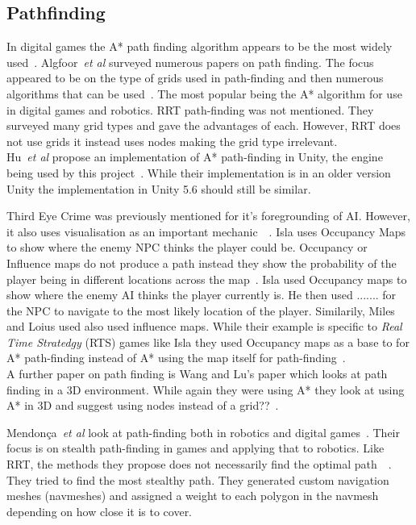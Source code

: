 \documentclass[journal]{IEEEtran}
\begin{document}
\subsection{Pathfinding}
In digital games the A* path finding algorithm appears to be the most widely used~\cite{Algfoor2015}.  Algfoor~\textit{et al} surveyed numerous papers on path finding. The focus appeared to be on the type of grids used in path-finding and then numerous algorithms that can be used~\cite{Algfoor2015}. The most popular being the A* algorithm for use in digital games and robotics. RRT path-finding was not mentioned. 
They surveyed many grid types and gave the advantages of each. However, RRT does not use grids it instead uses nodes making the grid type irrelevant.\\

Hu~\textit{et al} propose an implementation of A* path-finding in Unity, the engine being used by this project~\cite{Hu2012}.  While their implementation is in an older version Unity the implementation in Unity 5.6 should still be similar. 

Third Eye Crime was previously mentioned for it's foregrounding of AI. However, it also uses visualisation as an important mechanic~\cite{Isla2014}~\cite{ game:ThirdEyeCrime}. Isla uses Occupancy Maps to show where the enemy NPC thinks the player could be. Occupancy or Influence maps do not produce a path instead they show the probability of the player being in different locations across the map~\cite{Isla2014, Miles2006}. Isla used Occupancy maps to show where the enemy AI thinks the player currently is. He then used ....... for the NPC to navigate to the most likely location of the player. Similarily, Miles and Loius used also used influence maps. While their example is specific to \textit{Real Time Stratedgy} (RTS) games like Isla they used Occupancy maps as a base to for A* path-finding instead of A* using the map itself for path-finding~\cite{Miles2006}.\\
 
A further paper on path finding is Wang and Lu's paper which looks at path finding in a 3D environment. While again they were using A* they look at using A* in 3D and suggest using nodes instead of a grid??~\cite{wang2012}.

Mendonça~\textit{et al} look at path-finding both in robotics and digital games~\cite{Mendonça2015}. Their focus is on stealth path-finding in games and applying that to robotics. Like RRT, the methods they propose does not necessarily find the optimal path~\cite{karaman2010}~\cite{Mendonça2015}. They tried to find the most stealthy path. They generated custom navigation meshes (navmeshes) and assigned a weight to each polygon in the navmesh depending on how close it is to cover. 
\end{document}
